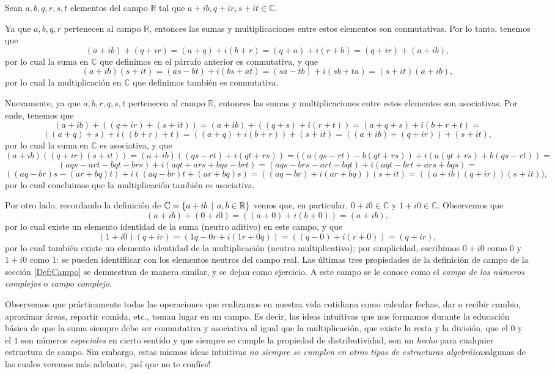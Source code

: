 \documentclass[12pt,dvipsnames]{article}
\begin{document}
Sean $a,b,q,r,s,t$ elementos del campo $\mathbb{R}$ tal que $a+ib, q+ir, s+it\in\mathbb{C}.$

Ya que $a,b,q,r$ pertenecen al campo $\mathbb{R}$, entonces las sumas y multiplicaciones entre estos elementos son conmutativas. Por lo tanto, tenemos que $$(a+ib)+(q+ir)=(a+q)+i(b+r)=(q+a)+i(r+b)=(q+ir)+(a+ib),$$\noindent por lo cual la suma en $\mathbb{C}$ que definimos en el párrafo anterior es conmutativa, y que $$(a+ib)(s+it)=(as-bt)+i(bs+at)=(sa-tb)+i(sb+ta)=(s+it)(a+ib),$$\noindent por lo cual la multiplicación en $\mathbb{C}$ que definimos también es conmutativa.

Nuevamente, ya que $a,b,r,q,s,t$ pertenecen al campo $\mathbb{R}$, entonces las sumas y multiplicaciones entre estos elementos son asociativas. Por ende, tenemos que $$(a+ib)+((q+ir)+(s+it))=(a+ib)+((q+s)+i(r+t))=(a+q+s)+i(b+r+t)=$$ $$((a+q)+s)+i((b+r)+t)=((a+q)+i(b+r))+(s+it)=((a+ib)+(q+ir))+(s+it),$$ por lo cual la suma en $\mathbb{C}$ es asociativa, y que $$(a+ib)((q+ir)(s+it))=(a+ib)((qs-rt)+i(qt+rs))=((a(qs-rt)-b(qt+rs))+i(a(qt+rs)+b(qs-rt))=$$ $$(aqs-art-bqt-brs)+i(aqt+ars+bqs-brt)=(aqs-brs-art-bqt)+i(aqt-brt+ars+bqs)=$$ $$((aq-br)s-(ar+bq)t)+i((aq-br)t+(ar+bq)s)=((aq-br)+i(ar+bq))(s+it)=((a+ib)(q+ir))(s+it)),$$\noindent por lo cual concluimos que la multiplicación también es asociativa.

Por otro lado, recordando la definición de $\mathbb{C}=\{a+ib\hspace{1.5mm}|\hspace{1.5mm}a,b\in\mathbb{R}\}$ vemos que, en particular, $0+i0\in\mathbb{C}$ y $1+i0\in\mathbb{C}$. Observemos que $$(a+ib)+(0+i0)=((a+0)+i(b+0))=(a+ib),$$ por lo cual existe un elemento identidad de la suma (neutro aditivo) en este campo, y que $$(1+i0)(q+ir)=(1q-0r+i(1r+0q))=((q-0)+i(r+0))=(q+ir),$$ \noindent por lo cual también existe un elemento identidad de la multiplicación (neutro multiplicativo); por simplicidad, escribimos $0+i0$ como $0$ y $1+i0$ como $1$: se pueden identifiicar con los elementos neutros del campo real. Las últimas tres propiedades de la definición de campo de la sección \ref{Def:Campo} se demuestran de manera similar, y se dejan como ejercicio. A este campo se le conoce como el \emph{campo de los números complejos} o \emph{campo complejo}.

Observemos que prácticamente todas las operaciones que realizamos en nuestra vida cotidiana como calcular fechas, dar o recibir cambio, aproximar áreas, repartir comida, etc., toman lugar en un campo. Es decir, las ideas intuitivas que nos formamos durante la educación básica de que la suma siempre debe ser conmutativa y asociativa \textemdash al igual que la multiplicación\textemdash\hspace{0.5mm}, que existe la resta y la división, que el $0$ y el $1$ son números \emph{especiales} en cierto sentido y que siempre se cumple la propiedad de distributividad, son un \emph{hecho} para cualquier estructura de campo. Sin embargo, estas mismas ideas intuitivas \emph{no siempre se cumplen en otros tipos de estructuras algebráicas}\textemdash algunas de las cuales veremos más adelante\textemdash\hspace{0.5mm}, ¡así que no te confíes!
\end{document}
